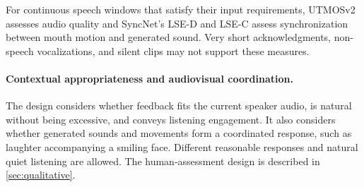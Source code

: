For continuous speech windows that satisfy their input requirements, UTMOSv2 assesses audio quality and SyncNet's LSE-D and LSE-C assess synchronization between mouth motion and generated sound. Very short acknowledgments, non-speech vocalizations, and silent clips may not support these measures.

\paragraph{Contextual appropriateness and audiovisual coordination.}
The design considers whether feedback fits the current speaker audio, is natural without being excessive, and conveys listening engagement. It also considers whether generated sounds and movements form a coordinated response, such as laughter accompanying a smiling face. Different reasonable responses and natural quiet listening are allowed. The human-assessment design is described in \cref{sec:qualitative}.
